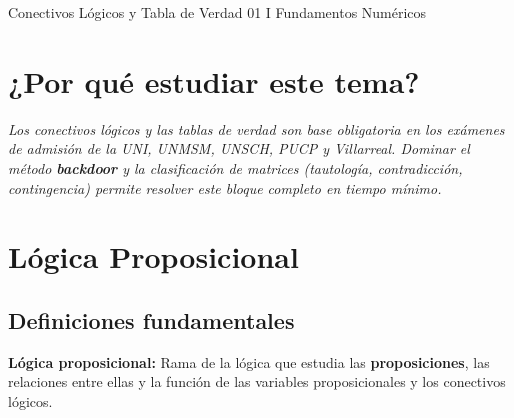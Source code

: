 	
	\portadaclase%
	{Conectivos Lógicos y Tabla de Verdad}%
	{01}%
	{I}%
	{Fundamentos Numéricos}%
	
	\section*{¿Por qué estudiar este tema?}
	\begin{tcolorbox}[
		enhanced, colback=AzulClaro!30, colframe=AzulMedio,
		arc=3pt, boxrule=0.6pt, left=10pt, right=10pt
		]
		\textit{Los conectivos lógicos y las tablas de verdad son base obligatoria en los
			exámenes de admisión de la UNI, UNMSM, UNSCH, PUCP y Villarreal. Dominar el
			método \textbf{backdoor} y la clasificación de matrices (tautología, contradicción,
			contingencia) permite resolver este bloque completo en tiempo mínimo.}
	\end{tcolorbox}
	\vspace{0.4cm}
	
	\section{Lógica Proposicional}
	
	\subsection{Definiciones fundamentales}
	
	\begin{cajadef}
		\textbf{Lógica proposicional:} Rama de la lógica que estudia las
		\textbf{proposiciones}, las relaciones entre ellas y la función de las
		variables proposicionales y los conectivos lógicos.
	\end{cajadef}
	
